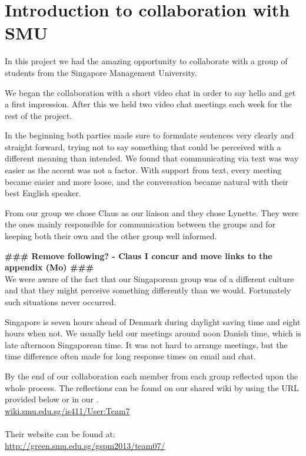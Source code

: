 \section{Introduction to collaboration with SMU}
In this project we had the amazing opportunity to collaborate with a group of students from the Singapore Management University.

We began the collaboration with a short video chat in order to say hello and get a first impression. After this we held two video chat meetings each week for the rest of the project.

In the beginning both parties made sure to formulate sentences very clearly and straight forward, trying not to say something that could be perceived with a different meaning than intended. We found that communicating via text was way easier as the accent was not a factor.
With support from text, every meeting became easier and more loose, and the conversation became natural with their best English speaker.

From our group we chose Claus as our liaison and they chose Lynette. They were the ones mainly responsible for communication between the groups and for keeping both their own and the other group well informed.

\textbf{\#\#\# Remove following? - Claus I concur and move links to the appendix (Mo) \#\#\#}\\
We were aware of the fact that our Singaporean group was of a different culture and that they might perceive something differently than we would. Fortunately such situations never occurred.

Singapore is seven hours ahead of Denmark during daylight saving time and eight hours when not. We usually held our meetings around noon Danish time, which is late afternoon Singaporean time. It was not hard to arrange meetings, but the time difference often made for long response times on email and chat.

By the end of our collaboration each member from each group reflected upon the whole process. The reflections can be found on our shared wiki by using the URL provided below or in our .
\\\url{wiki.smu.edu.sg/is411/User:Team7}\\\\

Their website can be found at:
\\\url{http://green.smu.edu.sg/gspm2013/team07/}
\newpage